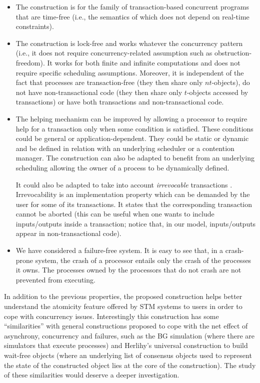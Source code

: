 \begin{itemize}

\item  The construction is for the family of transaction-based concurrent
programs  that are time-free (i.e., the semantics of which does not depend 
on real-time constraints). 

\item 
The construction  is lock-free and  works whatever the concurrency pattern
(i.e., it does not require concurrency-related  assumption such as 
obstruction-freedom). It  works for  both finite  and  infinite
computations and does not require  specific scheduling assumptions.  
%
Moreover,  it is  independent of the fact that 
processes  are  transaction-free (they then share  only
$nt$-objects),  do not have  non-transactional code (they then  share 
only $t$-objects  accessed by transactions)  or have both  transactions and
non-transactional code.  

\item  
The helping mechanism can be improved by allowing a processor to 
require help for a transaction only when  some condition is satisfied. 
These  conditions could be general or application-dependent. They could 
be static or dynamic and  be  defined in relation with an underlying
scheduler or a contention manager. 
The construction can also be  adapted  to benefit from an underlying 
scheduling allowing the owner of a process to be  dynamically defined.  

It could also be adapted to  take into account {\it irrevocable} transactions
\cite{SSDMS08,WSA08}. 
Irrevocability is an implementation property which can be 
demanded by the user for  some of its transactions. It states that 
the corresponding transaction cannot be aborted (this can be useful when 
one wants to include inputs/outputs inside a transaction; notice that, 
in our model, inputs/outputs appear in non-transactional code). 

\item  
We have considered a failure-free system. It is easy to see that, in a
 crash-prone system, the crash of a processor entails only the
crash of the processes it owns.  The processes owned by the processors that
do not crash are not prevented from executing.  
\end{itemize}

In addition to the previous properties, 
the proposed  construction helps better understand the atomicity feature  
offered  by STM systems to users in order to cope with concurrency issues. 
Interestingly this construction has some ``similarities'' with 
general constructions proposed to cope with the net effect of 
asynchrony, concurrency and failures, such as 
the BG simulation \cite{BG93}  (where there are simulators that execute 
processes) and   Herlihy's universal construction to  build  wait-free 
objects \cite{H91} (where an underlying list of consensus objects 
used to represent the state of the constructed object lies at the 
core of the construction). The study of these  similarities would 
deserve a  deeper investigation.
